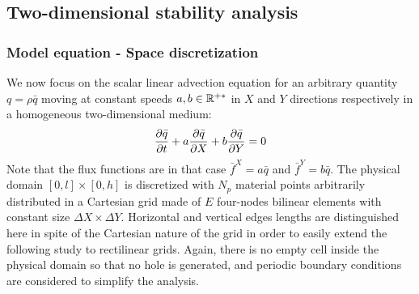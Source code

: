 \subsection{Two-dimensional stability analysis}
\subsubsection*{Model equation - Space discretization}
We now focus on the scalar linear advection equation for an arbitrary quantity $q=\rho \bar{q}$ moving at constant speeds $a,b \in \mathbb{R}^{+*}$ in $X$ and $Y$ directions respectively in a homogeneous two-dimensional medium:
\begin{equation}
  \label{eq:2D_model_equation}
  \frac{\partial \bar{q}}{\partial t} + a\frac{\partial \bar{q}}{\partial X} + b\frac{\partial \bar{q}}{\partial Y}= 0
\end{equation}
Note that the flux functions are in that case $\bar{f}^X = a\bar{q}$ and $\bar{f}^Y = b\bar{q}$. The physical domain $[0,l]\times[0,h]$ is discretized with $N_p$ material points arbitrarily distributed in a Cartesian grid made of $E$ four-nodes bilinear elements with constant size $\Delta X \times \Delta Y$. Horizontal and vertical edges lengths are distinguished here in spite of the Cartesian nature of the grid in order to easily extend the following study to rectilinear grids. Again, there is no empty cell inside the physical domain so that no hole is generated, and periodic boundary conditions are considered to simplify the analysis.

